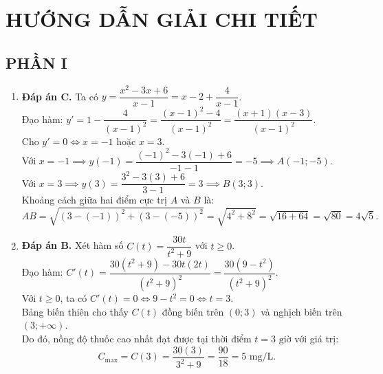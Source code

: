 \documentclass[12pt,a4paper]{article}
\begin{document}
\newpage
\section*{HƯỚNG DẪN GIẢI CHI TIẾT}

\subsection*{PHẦN I}
\begin{enumerate}[label=\textbf{Câu \arabic*:}, leftmargin=*]
\item \textbf{Đáp án C.}
Ta có $y = \dfrac{x^2 - 3x + 6}{x - 1} = x - 2 + \dfrac{4}{x - 1}$.\\
Đạo hàm: $y' = 1 - \dfrac{4}{(x - 1)^2} = \dfrac{(x - 1)^2 - 4}{(x - 1)^2} = \dfrac{(x + 1)(x - 3)}{(x - 1)^2}$.\\
Cho $y' = 0 \iff x = -1$ hoặc $x = 3$.\\
Với $x = -1 \implies y(-1) = \dfrac{(-1)^2 - 3(-1) + 6}{-1 - 1} = -5 \implies A(-1; -5)$.\\
Với $x = 3 \implies y(3) = \dfrac{3^2 - 3(3) + 6}{3 - 1} = 3 \implies B(3; 3)$.\\
Khoảng cách giữa hai điểm cực trị $A$ và $B$ là:
$$AB = \sqrt{(3 - (-1))^2 + (3 - (-5))^2} = \sqrt{4^2 + 8^2} = \sqrt{16 + 64} = \sqrt{80} = 4\sqrt{5}.$$

\item \textbf{Đáp án B.}
Xét hàm số $C(t) = \dfrac{30t}{t^2 + 9}$ với $t \ge 0$.\\
Đạo hàm: $C'(t) = \dfrac{30(t^2 + 9) - 30t(2t)}{(t^2 + 9)^2} = \dfrac{30(9 - t^2)}{(t^2 + 9)^2}$.\\
Với $t \ge 0$, ta có $C'(t) = 0 \iff 9 - t^2 = 0 \iff t = 3$.\\
Bảng biến thiên cho thấy $C(t)$ đồng biến trên $(0; 3)$ và nghịch biến trên $(3; +\infty)$.\\
Do đó, nồng độ thuốc cao nhất đạt được tại thời điểm $t = 3\text{ giờ}$ với giá trị:
$$C_{\max} = C(3) = \dfrac{30(3)}{3^2 + 9} = \dfrac{90}{18} = 5\text{ mg/L}.$$


\end{enumerate}
\end{document}
